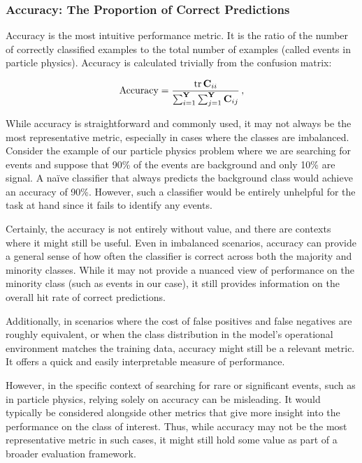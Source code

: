 \subsubsection{Accuracy: The Proportion of Correct Predictions}

Accuracy is the most intuitive performance metric. It is the ratio of the number of correctly classified examples
to the total number of examples (called events in particle physics). Accuracy is calculated trivially from the confusion
matrix:

\begin{align}
    \acc  = \frac{\trace \C_{ii}}{\sum_{i=1}^\classY \sum_{j=1}^\classY \C_{ij}}\,,
\end{align}

While accuracy is straightforward and commonly used, it may not always be the most representative metric, especially in
cases where the classes are imbalanced. Consider the example of our particle physics problem where we are searching for
\tth events and suppose that 90\% of the events are background and only 10\% are signal. A naïve classifier that
always predicts the background class would achieve an accuracy of 90\%. However, such a classifier would be entirely
unhelpful for the task at hand since it fails to identify any \tth events.

Certainly, the accuracy is not entirely without value, and there are contexts where it might still be useful. Even in
imbalanced scenarios, accuracy can provide a general sense of how often the classifier is correct across both the
majority and minority classes. While it may not provide a nuanced view of performance on the minority class (such as
\tth events in our case), it still provides information on the overall hit rate of correct predictions.

Additionally, in scenarios where the cost of false positives and false negatives are roughly equivalent, or when the
class distribution in the model's operational environment matches the training data, accuracy might still be a relevant
metric. It offers a quick and easily interpretable measure of performance.

However, in the specific context of searching for rare or significant events, such as \tth in particle physics, relying
solely on accuracy can be misleading. It would typically be considered alongside other metrics that give more insight
into the performance on the class of interest. Thus, while accuracy may not be the most representative metric in such
cases, it might still hold some value as part of a broader evaluation framework.

